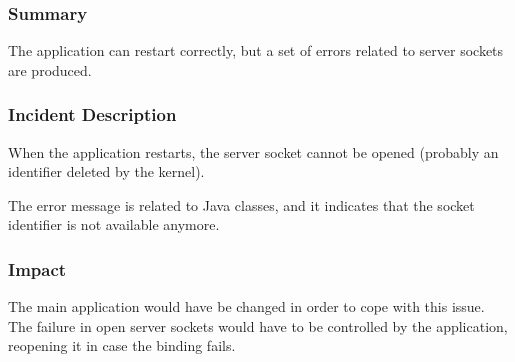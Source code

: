 


\subsubsection{Summary}

The application can restart correctly, but a set of errors related to server sockets are produced.


\subsubsection{Incident Description}
When the application restarts, the server socket cannot be opened (probably an identifier deleted by the kernel).

The error message is related to Java classes, and it indicates that the socket identifier is not available anymore.

\subsubsection{Impact}
The main application would have be changed in order to cope with this issue. The failure in open server sockets would have to be controlled by the application, reopening it in case the binding fails.

